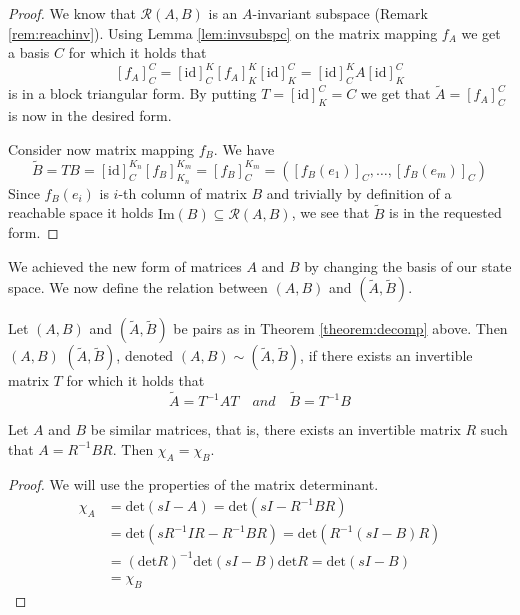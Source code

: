 \begin{proof}
	We know that $\mathcal{R}(A,B)$ is an $A$-invariant subspace (Remark \ref{rem:reachinv}). Using Lemma \ref{lem:invsubspc} on the matrix mapping $f_A$ we get a basis $C$ for which it holds that 
	$$[f_A]^C_C=[\text{id}]^K_C[f_A]^K_K[\text{id}]^C_K=[\text{id}]^K_CA[\text{id}]^C_K$$ 
	is in a block triangular form. By putting $T=[\text{id}]^C_K=C$ we get that $\widetilde{A}=[f_A]^C_C$ is now in the desired form.

	Consider now matrix mapping $f_B$. We have $$\widetilde{B}=TB=[\text{id}]^{K_n}_C[f_B]^{K_m}_{K_n}=[f_B]^{K_m}_C=([f_B(e_1)]_C,\ldots,[f_B(e_m)]_C)$$ Since $f_B(e_i)$ is $i$-th column of matrix $B$ and trivially by definition of a reachable space it holds $\text{Im}(B)\subseteq \mathcal{R}(A,B)$, we see that $\widetilde{B}$ is in the requested form.
\end{proof}

We achieved the new form of matrices $A$ and $B$ by changing the basis of our state space. We now define the relation between $(A,B)$ and $(\widetilde{A},\widetilde{B}).$

\begin{definition}
	Let $(A,B)$ and $(\widetilde{A},\widetilde{B})$ be pairs as in Theorem \ref{theorem:decomp} above. Then $(A,B)$  $(\widetilde{A},\widetilde{B})$, denoted $(A,B) \sim (\widetilde{A},\widetilde{B})$, if there exists an invertible matrix $T$ for which it holds that $$\widetilde{A}=T^{-1}AT\quad and\quad\widetilde{B}=T^{-1}B$$
\end{definition}

\begin{lemma}
	\label{lem:simMatrices}
	Let $A$ and $B$ be similar matrices, that is, there exists an invertible matrix $R$ such that $A=R^{-1}BR$. Then $\chi_A=\chi_B$.
\end{lemma}

\begin{proof}
	We will use the properties of the matrix determinant.
	\begin{align*}
		\chi_A&=\text{det}(sI-A)=\text{det}(sI-R^{-1}BR) \\
		&=\text{det}(sR^{-1}IR-R^{-1}BR)=\text{det}(R^{-1}(sI-B)R) \\
		&=(\text{det}R)^{-1}\text{det}(sI-B)\text{det}R=\text{det}(sI-B) \\
		&=\chi_B
	\end{align*}
\end{proof}

